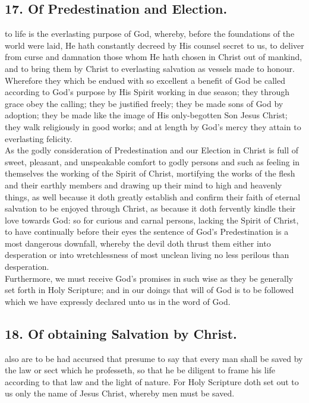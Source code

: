 \subsection{17. Of Predestination and Election.}
 to life is the everlasting purpose of God, whereby, before the foundations of the world were laid, He hath constantly decreed by His counsel secret to us, to deliver from curse and damnation those whom He hath chosen in Christ out of mankind, and to bring them by Christ to everlasting salvation as vessels made to honour. Wherefore they which be endued with so excellent a benefit of God be called according to God's purpose by His Spirit working in due season; they through grace obey the calling; they be justified freely; they be made sons of God by adoption; they be made like the image of His only-begotten Son Jesus Christ; they walk religiously in good works; and at length by God's mercy they attain to everlasting felicity.\\
As the godly consideration of Predestination and our Election in Christ is full of sweet, pleasant, and unspeakable comfort to godly persons and such as feeling in themselves the working of the Spirit of Christ, mortifying the works of the flesh and their earthly members and drawing up their mind to high and heavenly things, as well because it doth greatly establish and confirm their faith of eternal salvation to be enjoyed through Christ, as because it doth fervently kindle their love towards God: so for curious and carnal persons, lacking the Spirit of Christ, to have continually before their eyes the sentence of God's Predestination is a most dangerous downfall, whereby the devil doth thrust them either into desperation or into wretchlessness of most unclean living no less perilous than desperation.\\
Furthermore, we must receive God's promises in such wise as they be generally set forth in Holy Scripture; and in our doings that will of God is to be followed which we have expressly declared unto us in the word of God.

\subsection{18. Of obtaining Salvation by Christ.}
 also are to be had accursed that presume to say that every man shall be saved by the law or sect which he professeth, so that he be diligent to frame his life according to that law and the light of nature. For Holy Scripture doth set out to us only the name of Jesus Christ, whereby men must be saved.

